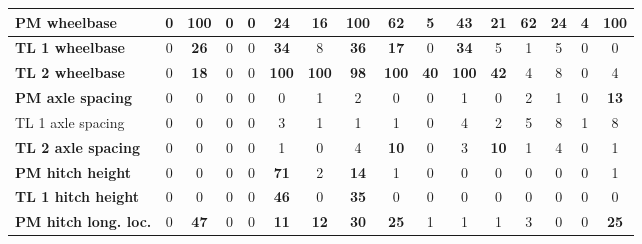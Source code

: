 \begin{table}[H]
\begin{tabular}{|l|c|c|c|c|c|c|c|c|c|c|c|c|c|c|c|}
\hline
\textcolor[rgb]{0.851, 0.373, 0.008}{\textbf{PM wheelbase}} & 0 & \textcolor[rgb]{0.835, 0.369, 0.000}{\textbf{100}} & 0 & 0 & \textbf{24} & \textbf{16} & \textcolor[rgb]{0.835, 0.369, 0.000}{\textbf{100}} & \textcolor[rgb]{0.000, 0.447, 0.698}{\textbf{62}} & 5 & \textcolor[rgb]{0.000, 0.620, 0.451}{\textbf{43}} & \textbf{21} & \textcolor[rgb]{0.000, 0.447, 0.698}{\textbf{62}} & \textbf{24} & 4 & \textcolor[rgb]{0.835, 0.369, 0.000}{\textbf{100}} \\
\hline
\textcolor[rgb]{0.000, 0.620, 0.451}{\textbf{TL 1 wheelbase}} & 0 & \textcolor[rgb]{0.000, 0.620, 0.451}{\textbf{26}} & 0 & 0 & \textcolor[rgb]{0.000, 0.620, 0.451}{\textbf{34}} & 8 & \textcolor[rgb]{0.000, 0.620, 0.451}{\textbf{36}} & \textbf{17} & 0 & \textcolor[rgb]{0.000, 0.620, 0.451}{\textbf{34}} & 5 & 1 & 5 & 0 & 0 \\
\hline
\textcolor[rgb]{0.851, 0.373, 0.008}{\textbf{TL 2 wheelbase}} & 0 & \textbf{18} & 0 & 0 & \textcolor[rgb]{0.835, 0.369, 0.000}{\textbf{100}} & \textcolor[rgb]{0.835, 0.369, 0.000}{\textbf{100}} & \textcolor[rgb]{0.000, 0.447, 0.698}{\textbf{98}} & \textcolor[rgb]{0.835, 0.369, 0.000}{\textbf{100}} & \textcolor[rgb]{0.000, 0.620, 0.451}{\textbf{40}} & \textcolor[rgb]{0.835, 0.369, 0.000}{\textbf{100}} & \textcolor[rgb]{0.000, 0.620, 0.451}{\textbf{42}} & 4 & 8 & 0 & 4 \\
\hline
\textbf{PM axle spacing} & 0 & 0 & 0 & 0 & 0 & 1 & 2 & 0 & 0 & 1 & 0 & 2 & 1 & 0 & \textbf{13} \\
\hline
TL 1 axle spacing & 0 & 0 & 0 & 0 & 3 & 1 & 1 & 1 & 0 & 4 & 2 & 5 & 8 & 1 & 8 \\
\hline
\textbf{TL 2 axle spacing} & 0 & 0 & 0 & 0 & 1 & 0 & 4 & \textbf{10} & 0 & 3 & \textbf{10} & 1 & 4 & 0 & 1 \\
\hline
\textcolor[rgb]{0.000, 0.447, 0.698}{\textbf{PM hitch height}} & 0 & 0 & 0 & 0 & \textcolor[rgb]{0.000, 0.447, 0.698}{\textbf{71}} & 2 & \textbf{14} & 1 & 0 & 0 & 0 & 0 & 0 & 0 & 1 \\
\hline
\textcolor[rgb]{0.000, 0.620, 0.451}{\textbf{TL 1 hitch height}} & 0 & 0 & 0 & 0 & \textcolor[rgb]{0.000, 0.620, 0.451}{\textbf{46}} & 0 & \textcolor[rgb]{0.000, 0.620, 0.451}{\textbf{35}} & 0 & 0 & 0 & 0 & 0 & 0 & 0 & 0 \\
\hline
\textcolor[rgb]{0.000, 0.620, 0.451}{\textbf{PM hitch long. loc.}} & 0 & \textcolor[rgb]{0.000, 0.620, 0.451}{\textbf{47}} & 0 & 0 & \textbf{11} & \textbf{12} & \textcolor[rgb]{0.000, 0.620, 0.451}{\textbf{30}} & \textcolor[rgb]{0.000, 0.620, 0.451}{\textbf{25}} & 1 & 1 & 1 & 3 & 0 & 0 & \textcolor[rgb]{0.000, 0.620, 0.451}{\textbf{25}} \\

\end{tabular}
\end{table}
